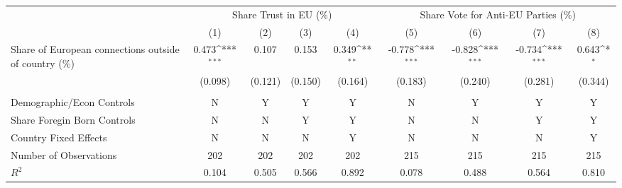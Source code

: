 {
\def\sym#1{\ifmmode^{#1}\else\(^{#1}\)\fi}
\begin{tabular}{l*{8}{c}}
\hline\hline
            &\multicolumn{4}{c}{Share Trust in EU (\%)}                                             &\multicolumn{4}{c}{Share Vote for Anti-EU Parties (\%)}                                \\
            &\multicolumn{1}{c}{(1)}         &\multicolumn{1}{c}{(2)}         &\multicolumn{1}{c}{(3)}         &\multicolumn{1}{c}{(4)}         &\multicolumn{1}{c}{(5)}         &\multicolumn{1}{c}{(6)}         &\multicolumn{1}{c}{(7)}         &\multicolumn{1}{c}{(8)}         \\
\hline
Share of European connections outside of country (\%)&       0.473\sym{***}&       0.107         &       0.153         &       0.349\sym{**} &      -0.778\sym{***}&      -0.828\sym{***}&      -0.734\sym{***}&       0.643\sym{*}  \\
            &     (0.098)         &     (0.121)         &     (0.150)         &     (0.164)         &     (0.183)         &     (0.240)         &     (0.281)         &     (0.344)         \\
            &                     &                     &                     &                     &                     &                     &                     &                     \\
\hline
Demographic/Econ Controls&           N         &           Y         &           Y         &           Y         &           N         &           Y         &           Y         &           Y         \\
Share Foregin Born Controls&           N         &           N         &           Y         &           Y         &           N         &           N         &           Y         &           Y         \\
Country Fixed Effects&           N         &           N         &           N         &           Y         &           N         &           N         &           N         &           Y         \\
Number of Observations&         202         &         202         &         202         &         202         &         215         &         215         &         215         &         215         \\
$R^2$       &       0.104         &       0.505         &       0.566         &       0.892         &       0.078         &       0.488         &       0.564         &       0.810         \\
\hline\hline
\end{tabular}
}
